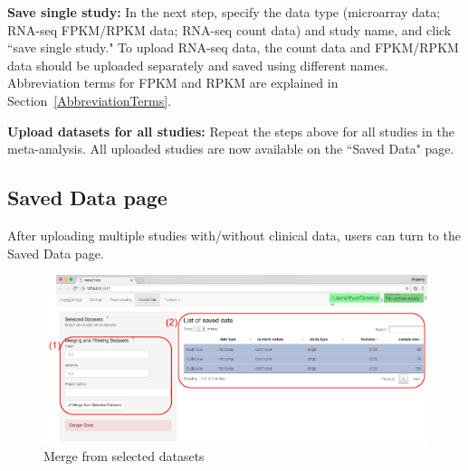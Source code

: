 \begin{steps}
\item \textbf{Save single study:}
In the next step,
specify the data type (microarray data; RNA-seq FPKM/RPKM data; RNA-seq count data) and study name,
and click ``save single study."
To upload RNA-seq data, the count data and FPKM/RPKM
 data should be uploaded separately and saved using different names.
Abbreviation terms for FPKM and RPKM are explained in Section~\ref{AbbreviationTerms}.

\item \textbf{Upload datasets for all studies:}
Repeat the steps above for all studies in the meta-analysis.
All uploaded studies are now available on the ``Saved Data" page. 
 
\end{steps}

\subsection{Saved Data page}
\label{sec:saved}

After uploading multiple studies with/without clinical data,
users can turn to the Saved Data page.

\begin{figure}[H]
\begin{center}
\includegraphics[scale=1]{./figure/preprocessing/GUImerge.pdf}
\caption{Merge from selected datasets}
\label{fig:GUImerge}
\end{center}
\end{figure}


